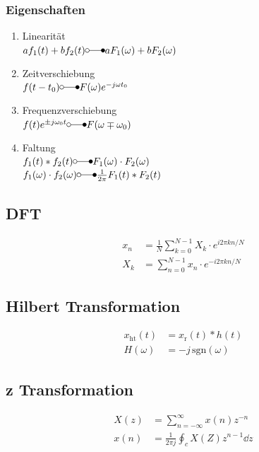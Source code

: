 \documentclass[10pt,a4paper]{article}
\begin{document}
  \subsubsection{Eigenschaften}
  \begin{mdframed}[style=exercise]
    \begin{enumerate}
      \item Linearität\\
      $a f_1(t) + b f_2(t) \laplace a F_1(\omega) + b F_2(\omega)$
      \item Zeitverschiebung\\
      $f(t-t_0) \laplace F(\omega)e^{-j\omega t_0}$
      \item Frequenzverschiebung\\
      $f(t) e^{\pm j\omega_0 t}\laplace F(\omega\mp \omega_0)$
      \item Faltung\\
      $f_1(t)*f_2(t)\laplace F_1(\omega)\cdot F_2(\omega)$\\
      $f_1(\omega)\cdot f_2(\omega)\laplace \frac{1}{2\pi}F_1(t)*F_2(t)$
    \end{enumerate}
  \end{mdframed}
  \subsection{DFT}
  \begin{mdframed}[style=exercise]
    \begin{align}
      x_n &= \frac{1}{N} \sum_{k=0}^{N-1} X_k\cdot e^{i 2 \pi k n / N}\\
      X_k &= \sum_{n=0}^{N-1} x_n\cdot e^{-i 2 \pi k n / N}
    \end{align}
  \end{mdframed}
  \pagebreak
  \subsection{Hilbert Transformation}
  \begin{mdframed}[style=exercise]
    \begin{align}
      x_{\mathrm{ht}}(t) &= x_{\mathrm{r}}(t) * h(t)\\
      H(\omega) &= -j \, \text{sgn}(\omega)
    \end{align}
  \end{mdframed}
  \subsection{z Transformation}
  \begin{mdframed}[style=exercise]
    \begin{align}
      X(z) &= \sum_{n=-\infty}^{\infty} x(n) z^{-n}\\
      x(n) &= \frac{1}{2\pi j} \oint_c X(Z) z^{n-1}\dd{z}
    \end{align}
  \end{mdframed}
\end{document}
